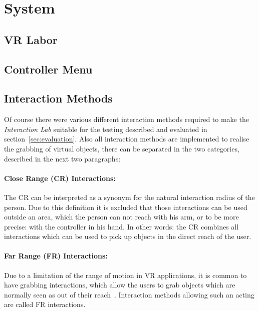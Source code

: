 \section{System}\label{sec:System}

\subsection{VR Labor}\label{sec:VRLabor}

\subsection{Controller Menu} \label{sec:Menu}

\subsection{Interaction Methods}\label{sec:Interactions}
Of course there were various different interaction methods required to make the \textit{Interaction Lab} suitable for the testing described and evaluated in section~\ref{sec:evaluation}. Also all interaction methods are implemented to realise the grabbing of virtual objects, there can be separated in the two categories, described in the next two paragraphs:

\paragraph{Close Range (CR) Interactions:} The CR can be interpreted as a synonym for the natural interaction radius of the person. Due to this definition it is excluded that those interactions can be used outside an area, which the person can not reach with his arm, or to be more precise: with the controller in his hand. In other words: the CR combines all interactions which can be used to pick up objects in the direct reach of the user.

\paragraph{Far Range (FR) Interactions:} Due to a limitation of the range of motion in VR applications, it is common to have grabbing interactions, which allow the users to grab objects which are normally seen as out of their reach~\cite{VRBook}. Interaction methods allowing such an acting are called FR interactions. \\

